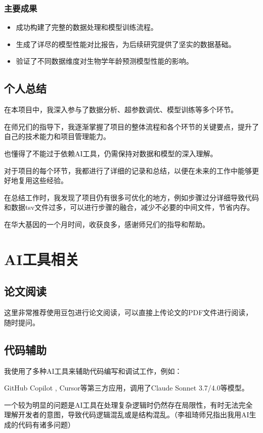 \documentclass[UTF8]{report}
\theoremstyle{MyLineTheoremStyle} %
\theoremstyle{MyBlockTheoremStyle} %
\theoremstyle{MySubsubsectionStyle} %
\begin{document}
\subsection*{主要成果}
\begin{itemize}
    \item 成功构建了完整的数据处理和模型训练流程。
    \item 生成了详尽的模型性能对比报告，为后续研究提供了坚实的数据基础。
    \item 验证了不同数据维度对生物学年龄预测模型性能的影响。
\end{itemize}

\section{个人总结}
在本项目中，我深入参与了数据分析、超参数调优、模型训练等多个环节。

在师兄们的指导下，我逐渐掌握了项目的整体流程和各个环节的关键要点，提升了自己的技术能力和项目管理能力。

也懂得了不能过于依赖AI工具，仍需保持对数据和模型的深入理解。    

对于项目的每个环节，我都进行了详细的记录和总结，以便在未来的工作中能够更好地复用这些经验。

在总结工作时，我发现了项目仍有很多可优化的地方，例如步骤过分详细导致代码和数据tsv文件过多，可以进行步骤的融合，减少不必要的中间文件，节省内存。

在华大基因的一个月时间，收获良多，感谢师兄们的指导和帮助。


\chapter{AI工具相关}

\section{论文阅读}
这里非常推荐使用豆包进行论文阅读，可以直接上传论文的PDF文件进行阅读，随时提问。

\section{代码辅助}

我使用了多种AI工具来辅助代码编写和调试工作，例如：

GitHub Copilot , Cursor等第三方应用，调用了Claude Sonnet 3.7/4.0等模型。

一个较为明显的问题是AI工具在处理复杂逻辑时仍然存在局限性，有时无法完全理解开发者的意图，导致代码逻辑混乱或是结构混乱。（李祖琦师兄指出我用AI生成的代码有诸多问题）
\end{document}
